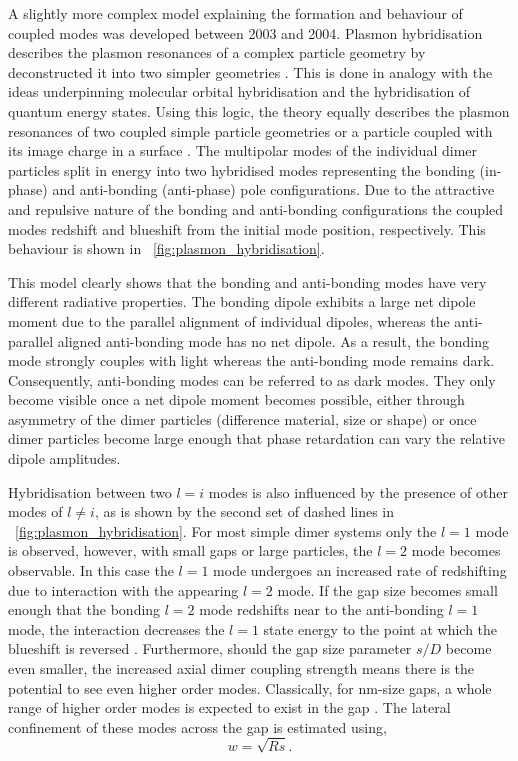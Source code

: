 \documentclass{article}
\begin{document}
A slightly more complex model explaining the formation and behaviour of coupled modes was developed between 2003 and 2004. Plasmon hybridisation describes the plasmon resonances of a complex particle geometry by deconstructed it into two simpler geometries \cite{prodan2003, prodan2004}. This is done in analogy with the ideas underpinning molecular orbital hybridisation and the hybridisation of quantum energy states. Using this logic, the theory equally describes the plasmon resonances of two coupled simple particle geometries \cite{nordlander2004} or a particle coupled with its image charge in a surface \cite{nordlander2004a}. The multipolar modes of the individual dimer particles split in energy into two hybridised modes representing the bonding (in-phase) and anti-bonding (anti-phase) pole configurations. Due to the attractive and repulsive nature of the bonding and anti-bonding configurations the coupled modes redshift and blueshift from the initial mode position, respectively. This behaviour is shown in \figurename~\ref{fig:plasmon_hybridisation}.

This model clearly shows that the bonding and anti-bonding modes have very different radiative properties. The bonding dipole exhibits a large net dipole moment due to the parallel alignment of individual dipoles, whereas the anti-parallel aligned anti-bonding mode has no net dipole. As a result, the bonding mode strongly couples with light whereas the anti-bonding mode remains dark. Consequently, anti-bonding modes can be referred to as dark modes. They only become visible once a net dipole moment becomes possible, either through asymmetry of the dimer particles (difference material, size or shape) or once dimer particles become large enough that phase retardation can vary the relative dipole amplitudes.

Hybridisation between two $l=i$ modes is also influenced by the presence of other modes of $l\neq i$, as is shown by the second set of dashed lines in \figurename~\ref{fig:plasmon_hybridisation}. For most simple dimer systems only the $l=1$ mode is observed, however, with small gaps or large particles, the $l=2$ mode becomes observable. In this case the $l=1$ mode undergoes an increased rate of redshifting due to interaction with the appearing $l=2$ mode. If the gap size becomes small enough that the bonding $l=2$ mode redshifts near to the anti-bonding $l=1$ mode, the interaction decreases the $l=1$ state energy to the point at which the blueshift is reversed \cite{nordlander2004}. Furthermore, should the gap size parameter $s/D$ become even smaller, the increased axial dimer coupling strength means there is the potential to see even higher order modes. Classically, for nm-size gaps, a whole range of higher order modes is expected to exist in the gap \cite{romero2006}. The lateral confinement of these modes across the gap is {\color{red}estimated} using,
\begin{equation} w = \sqrt{Rs}. \end{equation}
\end{document}
